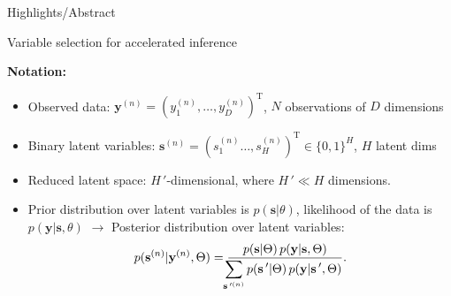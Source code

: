 \documentclass[final]{beamer}
\renewcommand{\vec}[1]{{\mathbf{#1}}}
\newcommand{\highlight}[1]{\textcolor{blocktbgn}{#1}}
\newcommand{\disS}{\displaystyle}
\newcommand{\Prime}{\,'}  %
\renewcommand{\vec}[1]{{\mathbf{#1}}}
\begin{document}
\begin{frame}{}
\begin{columns}[t]
\begin{column}{.33\linewidth}
\begin{block}{Highlights/Abstract}
    \vspace{-.3cm}
    \end{block}

    \begin{block}{Variable selection for accelerated inference}
          \vspace{-.5cm}

        \textbf{Notation:} \\
%
\begin{itemize}
\item \highlight{Observed data}: $\vec{y}^{(n)} = ( y_1^{(n)}, \dots, y_D^{(n)})^\mathrm{T}$, $N$ observations of $D$ dimensions


\item \highlight{Binary latent variables}: $\vec{s}^{(n)}=(s_1^{(n)}\dots, s^{(n)}_H)^\mathrm{T} \in \{0,1\}^{H}$, $H$ latent dims
\item \highlight{Reduced latent space}: $H\,'$-dimensional, where $H\,' \ll H$ dimensions.

\item \highlight{Prior distribution over latent variables} is $p(\vec{s} | \theta)$, \highlight{likelihood of the data} is $p(\vec{y} | \vec{s}, \theta)$ $\rightarrow$ \highlight{Posterior distribution over latent variables}: 
%
\vspace{-.05cm}
\normalsize
\begin{equation}
\label{eq:post}
p(\vec{s}^{(n)}|\vec{y}^{(n)},\Theta)  = \frac{p(\vec{s} | \Theta) \, p(\vec{y} | \vec{s}, \Theta)}
{\disS\hspace{-1.5mm}\sum_{\vec{s}\Prime^{(n)}} p(\vec{s}\Prime | \Theta) \, p(\vec{y} | \vec{s}\Prime, \Theta)}.
\end{equation}
\large


\end{itemize}
\end{block}
\end{column}
\end{columns}
\end{frame}
\end{document}
